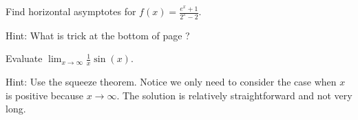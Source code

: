 \documentclass[../main.tex]{subfiles}
\begin{document}
\begin{exercise}\label{ex:asymptote-exp-mixed-bases}
  Find horizontal asymptotes for \(f(x) = \frac{e^{x}+1}{2^{x}-2}\).

  {\footnotesize Hint: What is trick at the bottom of page \pageref{eq:exp-change-of-base}?}

  \blanks*
\end{exercise}


\begin{exercise}\label{ex:limit-at-infinity-squeeze}
  Evaluate \(\lim_{x \to \infty} \frac{1}{x} \sin(x)\).

  {\scriptsize Hint: Use the squeeze theorem. Notice we only need to consider the case when \(x\) is positive because \(x \to \infty\). The solution is relatively straightforward and not very long.}

\end{exercise}

%
\end{document}
